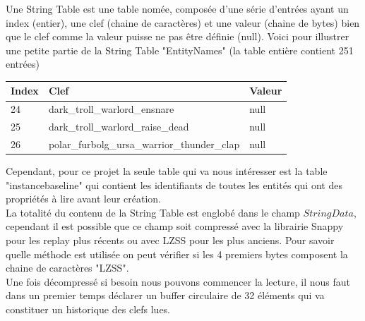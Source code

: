 \documentclass{article}
\begin{document}
Une String Table est une table nomée, composée d'une série d'entrées ayant un index (entier), une clef (chaine de caractères) et une valeur (chaine de bytes) bien que le clef comme la valeur puisse ne pas être définie (null). Voici pour illustrer une petite partie de la String Table "EntityNames" (la table entière contient 251 entrées)
\begin{center}
	\begin{tabular}{| l | l | l |}
  	 \hline
  		 Index & Clef & Valeur\\
  	 \hline
 	  	 24 & dark\_troll\_warlord\_ensnare & null  \\
  		 25 & dark\_troll\_warlord\_raise\_dead & null \\
  		 26 & polar\_furbolg\_ursa\_warrior\_thunder\_clap & null \\
   	\hline
	\end{tabular}
\end{center}

Cependant, pour ce projet la seule table qui va nous intéresser est la table "instancebaseline" qui contient les identifiants de toutes les entités qui ont des propriétés à lire avant leur création.\\

La totalité du contenu de la String Table est englobé dans le champ $StringData$, cependant il est possible que ce champ soit compressé avec la librairie Snappy pour les replay plus récents ou avec LZSS pour les plus anciens. Pour savoir quelle méthode est utilisée on peut vérifier si les 4 premiers bytes composent la chaine de caractères "LZSS".\\
Une fois décompressé si besoin nous pouvons commencer la lecture, il nous faut dans un premier temps déclarer un buffer circulaire de 32 éléments qui va constituer un historique des clefs lues.\\
\end{document}
